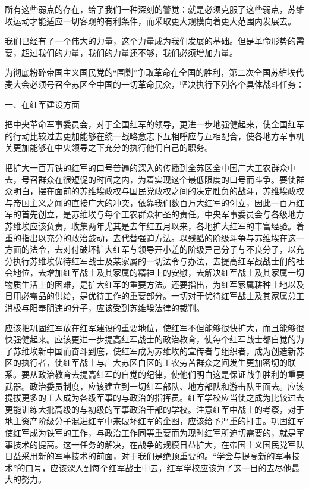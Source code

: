 所有这些弱点的存在，给了我们一种深刻的警觉：就是必须克服了这些弱点，苏维埃运动才能适应一切客观的有利条件，而釆取更大规模向着更大范围内发展去。

我们已经有了一个伟大的力量，这个力量成为我们发展的基础。但是革命形势的需要，超过我们的力量，我们的力量还不够，我们必须增加力量。

为彻底粉碎帝国主义国民党的“围剿”争取革命在全国的胜利，第二次全国苏维埃代麦大会必须号召全苏区全中国的一切革命民众，坚决执行下列各个具体战斗任务：

一、在红军建设方面

把中央革命军事委员会，对于全国红军的领导，更进一步地强健起来，使全国红军的行动比较过去更加能够在统一战略意志下互相呼应与互相配合，使各地方军事机关更加能够在中央领导之下充分的执行他们自己的职务。

把扩大一百万铁的红军的口号普遍的深入的传播到全苏区全中国广大工农群众中去，号召群众在很短促的时间之内，为着实现这个最低限度的口号而斗争。要使群众明白，摆在面前的苏维埃政权与国民党政权之间的决定胜负的战斗，苏维埃政权与帝国主义之闻的直接广大的冲突，依靠我们数百万大红军的创立，因此一百万红军的首先创立，是苏维埃与每个工农群众神圣的责任。中央军事委员会与各级地方苏维埃应该负责，收集两年尤其是去年红五月以来，各地扩大红军的丰富经验。着重的指出以充分的政治鼓动，去代替强迫方法。以残酷的阶级斗争与苏维埃在这一方面的法令，去对付破坏扩大红军与领导开小差的阶级异己分子与不良分子，以充分执行苏维埃优待红军战士及某家属的一切法令与办法，去提高红军战战士们的社会地位，去增加红军战士及其家属的精神上的安慰，去解决红军战士及其家属一切物质生活上的困难，是扩大红军的重要方法。还要指出，为红军家属耕种土地以及日用必需品的供给，是优待工作的重要部分。一切对于优待红军战士及其家属怠工消极与阳奉阴违的分子，应该受到苏维埃法律的裁判。

应该把巩固红军放在红军建设的重要地位，使红军不但能够很快扩大，而且能够很快强健起来。应该更进一步提高红军战士的政治教育，使每个红军战士都自觉的为了苏维埃新中国而奋斗到底，使红军成为苏维埃的宣传者与组织者，成为创造新苏区的执行者，使红军战士与广大苏区白区的工农劳苦群众之间发生更加密切的联系。要从政治教育去提高红军的自觉的纪律，使他们明白这是保证战争胜利的重要武器。政治委员制度，应该建立到一切红军部队、地方部队和游击队里面去。应该提拔更多的工人成为各级军事的与政治的指挥员。红军学校应当使之成为比较过去更能训练大批高级的与初级的军事政治干部的学校。注意红军中战士的考察，对于地主资产阶级分子混进红军中来破坏红军的企图，应该给予严重的打击。巩固红军使红军成为铁军的工作，与政治工作同等重要而为现时红军所迫切需要的，就是军事技术的提高。这一任务的解决，在战争的规模日益扩大，在帝国主义国民党军队日益采用新的军事技术的前面，对于我们是绝顶重要的。“学会与提高新的军事技术”的口号，应该深入到每个红军战士中去，红军学校应该为了这一目的去尽他最大的努力。

